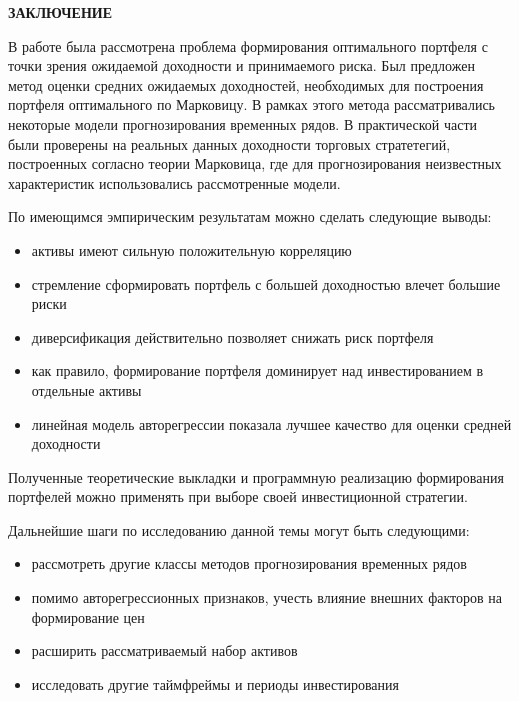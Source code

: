 \newpage
\begin{center}
	\textbf{\large ЗАКЛЮЧЕНИЕ}
\end{center}

В работе была рассмотрена проблема формирования оптимального портфеля с точки зрения ожидаемой доходности и принимаемого риска.
Был предложен метод оценки средних ожидаемых доходностей, необходимых для построения портфеля оптимального по Марковицу.
В рамках этого метода рассматривались некоторые модели прогнозирования временных рядов. 
В практической части были проверены на реальных данных доходности торговых стратетегий, построенных согласно теории Марковица,
где для прогнозирования неизвестных характеристик использовались рассмотренные модели.

По имеющимся эмпирическим результатам можно сделать следующие выводы:
\begin{itemize}
	\item активы имеют сильную положительную корреляцию
	\item стремление  сформировать портфель с большей доходностью влечет большие риски
	\item диверсификация действительно позволяет снижать риск портфеля
	\item как правило, формирование портфеля доминирует над инвестированием в отдельные активы
	\item линейная модель авторегрессии показала лучшее качество для оценки средней доходности
\end{itemize}

Полученные теоретические выкладки и программную реализацию формирования портфелей можно применять
при выборе своей инвестиционной стратегии. 

Дальнейшие шаги по исследованию данной темы могут быть следующими:
\begin{itemize}
	\item рассмотреть другие классы методов прогнозирования временных рядов
	\item помимо авторегрессионных признаков, учесть влияние внешних факторов на формирование цен
	\item расширить рассматриваемый набор активов
	\item исследовать другие таймфреймы и периоды инвестирования
\end{itemize}